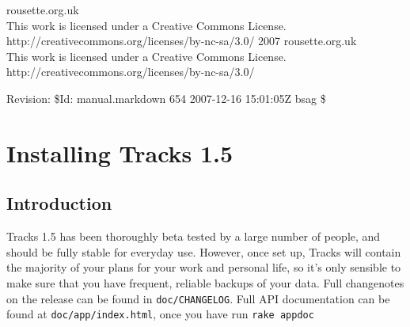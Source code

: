 \documentclass[10pt,twoside]{memoir}
\date{2007-11-25}
\title{\mytitle}
\author{\myauthor}
\def\mychapterstyle{BlueBox}
\def\mypagestyle{myruledpagestyle}
\def\revision{}
\def\mycopyright{2007 rousette.org.uk \\ This work is licensed under a Creative Commons License. \\ http://creativecommons.org/licenses/by-nc-sa/3.0/}
\def\revision{Revision: \$Id: manual.markdown 654 2007-12-16 15:01:05Z bsag \$}
\begin{document}
\chapterstyle{\mychapterstyle}
\pagestyle{\mypagestyle}

%
%

\frontmatter



\maketitle
\clearpage

\vspace*{\fill}

\setlength{\parindent}{0pt}

\ifx\mycopyright\undefined
\else
	\textcopyright{} \mycopyright
\fi

\revision

\begin{center}
\end{center}

\setlength{\parindent}{1em}
\clearpage

\tableofcontents


%
%


\setlength{\parindent}{0pt}
\setlength{\parskip}{\baselineskip/2}

\mainmatter
\chapter{Installing Tracks 1.5}
\label{installingtracks1.5}

\section{Introduction}
\label{introduction}

Tracks 1.5 has been thoroughly beta tested by a large number of people, and should be fully stable for everyday use. However, once set up, Tracks will contain the majority of your plans for your work and personal life, so it's only sensible to make sure that you have frequent, reliable backups of your data. Full changenotes on the release can be found in \texttt{doc/CHANGELOG}. Full API documentation can be found at \texttt{doc/app/index.html}, once you have run \texttt{rake appdoc}
\end{document}
